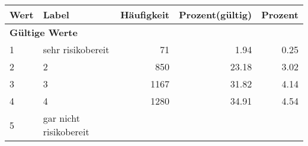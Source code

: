      \begin{longtable}{lXrrr}
     \toprule
     \textbf{Wert} & \textbf{Label} & \textbf{Häufigkeit} & \textbf{Prozent(gültig)} & \textbf{Prozent} \\
     \endhead
     \midrule
     \multicolumn{5}{l}{\textbf{Gültige Werte}}\\

     1 &
     \multicolumn{1}{X}{ sehr risikobereit   } &


       \num{71} &
       \num[round-mode=places,round-precision=2]{1.94} &
         \num[round-mode=places,round-precision=2]{0.25} \\

     2 &
     \multicolumn{1}{X}{ 2   } &


       \num{850} &
       \num[round-mode=places,round-precision=2]{23.18} &
         \num[round-mode=places,round-precision=2]{3.02} \\

     3 &
     \multicolumn{1}{X}{ 3   } &


       \num{1167} &
       \num[round-mode=places,round-precision=2]{31.82} &
         \num[round-mode=places,round-precision=2]{4.14} \\

     4 &
     \multicolumn{1}{X}{ 4   } &


       \num{1280} &
       \num[round-mode=places,round-precision=2]{34.91} &
         \num[round-mode=places,round-precision=2]{4.54} \\

     5 &
     \multicolumn{1}{X}{ gar nicht risikobereit   } &



\end{longtable}
